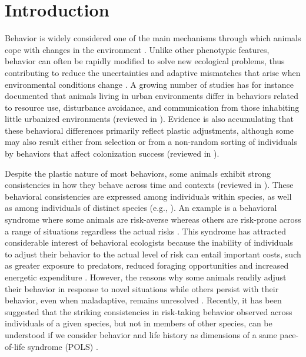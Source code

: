 \section{Introduction}

Behavior is widely considered one of the main mechanisms
through which animals cope with changes in the environment
\citep{Bogert1949, klopfer1962, mayr1965}. Unlike other phenotypic
features, behavior can often be rapidly modified to solve
new ecological problems, thus contributing to reduce the uncertainties
and adaptive mismatches that arise when environmental 
conditions change \citep{Huey2003, Price2003, Estrada2016, Sol2016}. 
A growing number
of studies has for instance documented that animals living
in urban environments differ in behaviors related to resource
use, disturbance avoidance, and communication from those
inhabiting little urbanized environments (reviewed in 
\citet{Shochat2006, Evans2012, Lowry2013, Sol2013a}). 
Evidence is also accumulating that these behavioral differences
primarily reflect plastic adjustments, although some
may also result either from selection or from a non-random
sorting of individuals by behaviors that affect colonization success
(reviewed in \citet{Sol2013a}).

Despite the plastic nature of most behaviors, some animals
exhibit strong consistencies in how they behave across time
and contexts (reviewed in \cite{Sih2004, Reale2007}).
These behavioral consistencies are expressed among individuals
within species, as well as among individuals of distinct
species (e.g., \citet{Moller1994, Verbeek1994, Koolhaas1999, Gosling2001, Greenberg2003, Sih2004, Reale2007}).
An example is a behavioral syndrome where
some animals are risk-averse whereas others are risk-prone
across a range of situations regardless the actual risks \citep{Sih2004, Sih2012a}.
This syndrome has attracted considerable
interest of behavioral ecologists because the inability of individuals
to adjust their behavior to the actual level of risk can
entail important costs, such as greater exposure to predators,
reduced foraging opportunities and increased energetic expenditure
\citep{Sih2004, Sih2012a}. However, the reasons why some
animals readily adjust their behavior in response to novel situations
while others persist with their behavior, even when maladaptive,
remains unresolved \citep{Sih2004}. Recently, it has
been suggested that the striking consistencies in risk-taking
behavior observed across individuals of a given species, but
not in members of other species, can be understood if we consider
behavior and life history as dimensions of a same pace-of-life
syndrome (POLS) \citep{Wolf2007, Reale2010a}.

